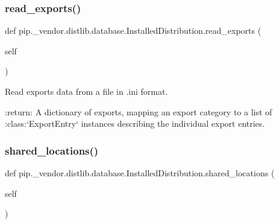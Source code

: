 \subsubsection{\texorpdfstring{read\+\_\+exports()}{read\_exports()}}
{\footnotesize\ttfamily def pip.\+\_\+vendor.\+distlib.\+database.\+Installed\+Distribution.\+read\+\_\+exports (\begin{DoxyParamCaption}\item[{}]{self }\end{DoxyParamCaption})}

\begin{DoxyVerb}Read exports data from a file in .ini format.

:return: A dictionary of exports, mapping an export category to a list
 of :class:`ExportEntry` instances describing the individual
 export entries.
\end{DoxyVerb}
 \mbox{\label{classpip_1_1__vendor_1_1distlib_1_1database_1_1InstalledDistribution_acb9d762b10d0e0269e958d3f89307d10}} 
\subsubsection{\texorpdfstring{shared\+\_\+locations()}{shared\_locations()}}
{\footnotesize\ttfamily def pip.\+\_\+vendor.\+distlib.\+database.\+Installed\+Distribution.\+shared\+\_\+locations (\begin{DoxyParamCaption}\item[{}]{self }\end{DoxyParamCaption})}

